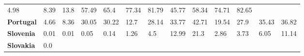 \begin{table}[H]
{\begin{tabular}{lllllllllllll}
            4.98                                               &
            8.39                                               &
            13.8                                               &
            57.49                                              &
            65.4                                               &
            77.34                                              &
            81.79                                              &
            45.77                                              &
            58.34                                              &
            74.71                                              &
            82.65                                                \\
            \textbf{Portugal}                                  &
            4.66                                               &
            8.36                                               &
            30.05                                              &
            30.22                                              &
            12.7                                               &
            28.14                                              &
            33.77                                              &
            42.71                                              &
            19.54                                              &
            27.9                                               &
            35.43                                              &
            36.82                                                \\
            \textbf{Slovenia}                                  &
            0.01                                               &
            0.01                                               &
            0.05                                               &
            0.14                                               &
            1.26                                               &
            4.5                                                &
            12.99                                              &
            21.3                                               &
            2.86                                               &
            3.73                                               &
            6.05                                               &
            11.14                                                \\
            \textbf{Slovakia}                                  &
            0.0                                                &

\end{tabular}}
\end{table}
